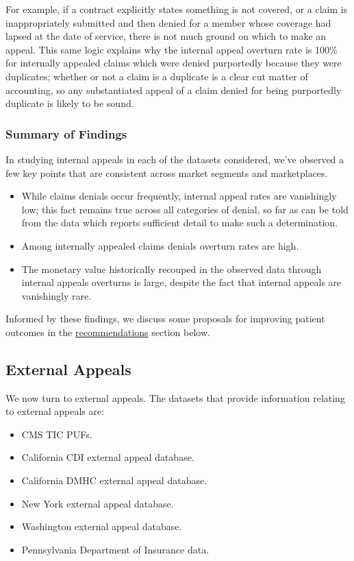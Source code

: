 \documentclass[12pt, a4paper,twoside,parskip=full]{report}
\theoremstyle{plain} %
\theoremstyle{definition} %
\theoremstyle{remark} %
\numberwithin{equation}{chapter}
\begin{document}
		
		For example, if a contract explicitly states something is not covered, or a claim is inappropriately submitted and then denied for a member whose coverage had lapsed at the date of service, there is not much ground on which to make an appeal. This same logic explains why the internal appeal overturn rate is 100\% for internally appealed claims which were denied purportedly because they were duplicates; whether or not a claim is a duplicate is a clear cut matter of accounting, so any substantiated appeal of a claim denied for being purportedly duplicate is likely to be sound.
		
		\subsubsection{Summary of Findings}
		
		In studying internal appeals in each of the datasets considered, we've observed a few key points
		that are consistent across market segments and marketplaces. 
		
		\begin{itemize}
			\item While claims denials occur frequently, internal appeal rates are vanishingly low; this fact remains true
			across all categories of denial, so far as can be told from the data which reports sufficient detail
			to make such a determination.
			\item Among internally appealed claims denials overturn rates are high.
			\item The monetary value historically recouped in the observed data through internal appeals overturns
			is large, despite the fact that internal appeals are vanishingly rare.
		\end{itemize}
	
		Informed by these findings, we discuss some proposals for improving patient outcomes 
		in the \hyperref[recommendations]{recommendations} section below.
		
		
		\subsection{External Appeals}\label{publicdata:externalappeals}
		
		We now turn to external appeals. The datasets that provide information relating to external appeals are:
		
		\begin{itemize}
			\item CMS TIC PUFs.
			\item California CDI external appeal database.
			\item California DMHC external appeal database.
			\item New York external appeal database.
			\item Washington external appeal database.
			\item Pennsylvania Department of Insurance data.
		\end{itemize}
	
\end{document}
